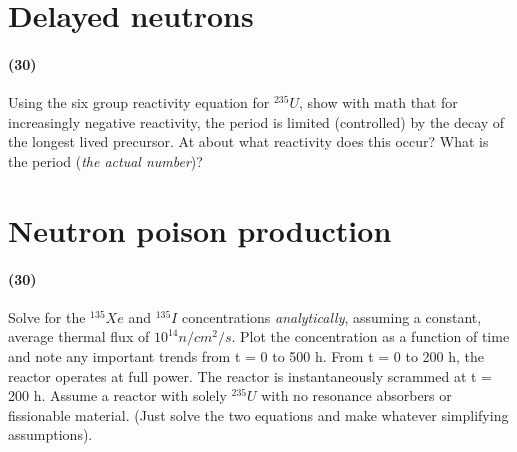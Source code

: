 \documentclass[11pt,a4paper]{article}
\begin{document}
\newpage

\section{Delayed neutrons}
\paragraph*{(30)}
Using the six group reactivity equation for $^{235}U$, show with math that for increasingly negative reactivity, the period is limited (controlled) by the decay of the longest lived precursor. At about what reactivity does this occur? What is the period (\textit{the actual number})?





\newpage

\section{Neutron poison production}
\paragraph*{(30)}
Solve for the $^{135}Xe$ and $^{135}I$ concentrations \textit{analytically}, assuming a constant, average thermal flux of $10^{14} n/cm^2/s$. Plot the concentration as a function of time and note any important trends from t = 0 to 500 h. From t = 0 to 200 h, the reactor operates at full power. The reactor is instantaneously scrammed at t = 200 h. Assume a reactor with solely $^{235}U$ with no resonance absorbers or fissionable material. (Just solve the two equations and make whatever simplifying assumptions).






\end{document}
